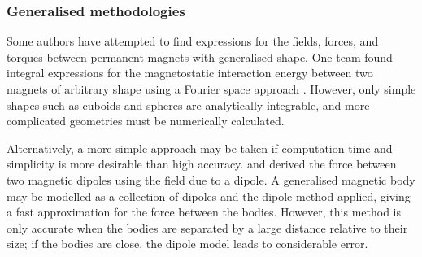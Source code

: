 \subsubsection{Generalised methodologies}
Some authors have attempted to find expressions for the fields, forces, and torques between permanent magnets with generalised shape. One team found integral expressions for the magnetostatic interaction energy between two magnets of arbitrary shape using a Fourier space approach \cite{Beleggia2005,Beleggia2003,Beleggia2004,DeGraef2009}. However, only simple shapes such as cuboids and spheres are analytically integrable, and more complicated geometries must be numerically calculated.

Alternatively, a more simple approach may be taken if computation time and simplicity is more desirable than high accuracy. \textcite{Yung1998} and \textcite{Furlani2001} derived the force between two magnetic dipoles using the field due to a dipole. A generalised magnetic body may be modelled as a collection of dipoles and the dipole method applied, giving a fast approximation for the force between the bodies. However, this method is only accurate when the bodies are separated by a large distance relative to their size; if the bodies are close, the dipole model leads to considerable error.


